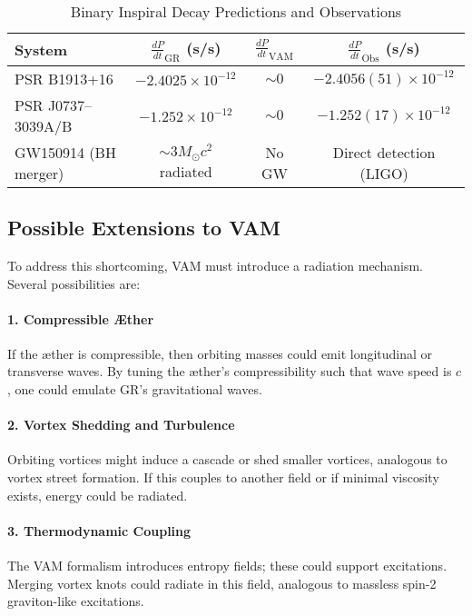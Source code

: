 \begin{table}[h!]
    \centering
    \caption{Binary Inspiral Decay Predictions and Observations}
    \label{tab:gw_comparison}
    \begin{tabular}{lccc}
        \toprule
        System & $\frac{dP}{dt}_\text{GR}$ (s/s) & $\frac{dP}{dt}_\text{VAM}$ & $\frac{dP}{dt}_\text{Obs}$ (s/s) \\
        \midrule
        PSR B1913+16 & $-2.4025\times10^{-12}$ & $\sim 0$ & $-2.4056(51)\times10^{-12}$ \\
        PSR J0737--3039A/B & $-1.252\times10^{-12}$ & $\sim 0$ & $-1.252(17)\times10^{-12}$ \\
        GW150914 (BH merger) & $\sim 3M_\odot c^2$ radiated & No GW & Direct detection (LIGO) \\
        \bottomrule
    \end{tabular}
\end{table}

\subsection*{Possible Extensions to VAM}

To address this shortcoming, VAM must introduce a radiation mechanism. Several possibilities are:

\paragraph{1. Compressible Æther} If the æther is compressible, then orbiting masses could emit longitudinal or transverse waves. By tuning the æther's compressibility such that wave speed is $c$, one could emulate GR's gravitational waves.

\paragraph{2. Vortex Shedding and Turbulence} Orbiting vortices might induce a cascade or shed smaller vortices, analogous to vortex street formation. If this couples to another field or if minimal viscosity exists, energy could be radiated.

\paragraph{3. Thermodynamic Coupling} The VAM formalism introduces entropy fields; these could support excitations. Merging vortex knots could radiate in this field, analogous to massless spin-2 graviton-like excitations.

